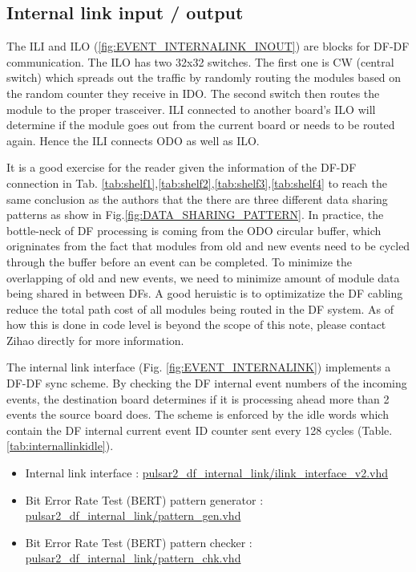 \documentclass[11pt,letterpaper]{article}
\begin{document}
\clearpage 

\subsection{Internal link input / output}

The ILI and ILO (\ref{fig:EVENT_INTERNALINK_INOUT}) are blocks for DF-DF communication. The ILO has two 32x32 switches. The first one is CW (central switch) which spreads out the traffic by randomly routing the modules based on the random counter they receive in IDO. The second switch then routes the module to the proper trasceiver. ILI connected to another board's ILO will determine if the module goes out from the current board or needs to be routed again. Hence the ILI connects ODO as well as ILO. 

It is a good exercise for the reader given the information of the DF-DF connection in Tab. \ref{tab:shelf1},\ref{tab:shelf2},\ref{tab:shelf3},\ref{tab:shelf4} to reach the same conclusion as the authors that the there are three different data sharing patterns as show in Fig.\ref{fig:DATA_SHARING_PATTERN}. In practice, the bottle-neck of DF processing is coming from the ODO circular buffer, which origninates from the fact that modules from old and new events need to be cycled through the buffer before an event can be completed. To minimize the overlapping of old and new events, we need to minimize amount of module data being shared in between DFs. A good heruistic is to optimizatize the DF cabling reduce the total path cost of all modules being routed in the DF system. As of how this is done in code level is beyond the scope of this note, please contact Zihao directly for more information. 

The internal link interface (Fig. \ref{fig:EVENT_INTERNALINK}) implements a DF-DF sync scheme. By checking the DF internal event numbers of the incoming events, the destination board determines if it is processing ahead more than 2 events the source board does. The scheme is enforced by the idle words which contain the DF internal current event ID counter sent every 128 cycles (Table. \ref{tab:internallinkidle}). 

\begin{itemize}
\item Internal link interface : \url{pulsar2_df_internal_link/ilink_interface_v2.vhd}
\item Bit Error Rate Test (BERT) pattern generator : \url{pulsar2_df_internal_link/pattern_gen.vhd}
\item Bit Error Rate Test (BERT) pattern checker : \url{pulsar2_df_internal_link/pattern_chk.vhd}
\end{itemize}
\end{document}
